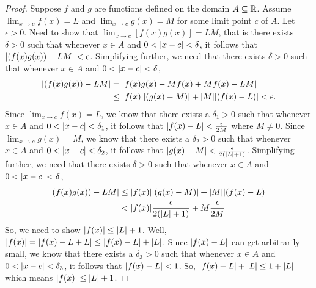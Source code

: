 \documentclass[12pt,letterpaper]{article}
\begin{document}
\begin{itemize}[leftmargin=!,labelindent=5pt]
\begin{itemize}
                        \begin{proof}
                            Suppose $f$ and $g$ are functions defined on the domain $A \subseteq \mathbb{R}$.
                            Assume $\lim_{x \to c} f(x) = L$ and $\lim_{x \to c} g(x) = M$ for some limit point $c$ of $A$.
                            Let $\epsilon > 0$.
                            Need to show that $\lim_{x \to c} [f(x)g(x)] = LM$, that is there exists $\delta > 0$ such that whenever $x \in A$ and $0 < \abs{x-c} < \delta$, it follows that $\abs{(f(x)g(x)) - LM} < \epsilon$.
                            Simplifying further, we need that there exists $\delta > 0$ such that whenever $x \in A$ and $0 < \abs{x-c} < \delta$,
                                \begin{align*}
                                    \abs{(f(x)g(x)) - LM} &= \abs{f(x)g(x) - Mf(x) + Mf(x) - LM} \\
                                    &\leq \abs{f(x)}\abs{(g(x)-M)} + \abs{M}\abs{(f(x) - L)} < \epsilon.
                                \end{align*}
                            Since $\lim_{x \to c} f(x) = L$, we know that there exists a $\delta_1>0$ such that whenever $x \in A$ and $0 < \abs{x-c} < \delta_1$, it follows that $\abs{f(x) - L} < \frac{\epsilon}{2M}$ where $M \neq 0$.
                            Since $\lim_{x \to c} g(x) = M$, we know that there exists a $\delta_2>0$ such that whenever $x \in A$ and $0 < \abs{x-c} < \delta_2$, it follows that $\abs{g(x) - M} < \frac{\epsilon}{2(\abs{L}+1)}$.
                            Simplifying further, we need that there exists $\delta > 0$ such that whenever $x \in A$ and $0 < \abs{x-c} < \delta$,
                                \begin{align*}
                                    \abs{(f(x)g(x)) - LM} &\leq \abs{f(x)}\abs{(g(x)-M)} + \abs{M}\abs{(f(x) - L)} \\
                                    &< \abs{f(x)}\frac{\epsilon}{2(\abs{L}+1)} + M\frac{\epsilon}{2M}
                                \end{align*}
                            So, we need to show $\abs{f(x)} \leq \abs{L} + 1$.
                            Well, $\abs{f(x)} = \abs{f(x) - L + L} \leq \abs{f(x) - L} + \abs{L}$.
                            Since $\abs{f(x) - L}$ can get arbitrarily small, we know that there exists a $\delta_3 >0$ such that whenever $x \in A$ and $0 < \abs{x-c} < \delta_3$, it follows that $\abs{f(x) - L} < 1$.
                            So, $\abs{f(x) - L} + \abs{L} \leq 1 + \abs{L}$ which means $\abs{f(x)} \leq \abs{L} + 1$.

\end{proof}
\end{itemize}
\end{itemize}
\end{document}
